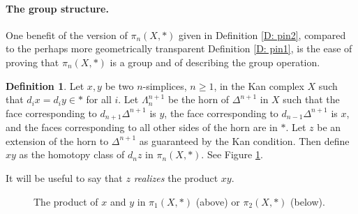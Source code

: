 \documentclass[12pt]{article}
\theoremstyle{plain}
\theoremstyle{definition}
\newtheorem{definition}[theorem]{Definition}
\theoremstyle{remark}
\begin{document}
\paragraph{The group structure.}

One benefit of the version of $\pi_n(X,*)$ given in Definition \ref{D: pin2}, compared to the perhaps more geometrically transparent Definition \ref{D: pin1}, is the ease of  proving that $\pi_n(X,*)$ is a group and of describing the group operation.

\begin{definition}\label{D: pi product}
Let $x,y$ be two $n$-simplices, $n\geq 1$, in the Kan complex $X$ such that $d_ix=d_iy\in *$ for all $i$. Let $\Lambda^{n+1}_n$ be the horn of $\Delta^{n+1}$ in $X$ such that the face corresponding to $d_{n+1}\Delta^{n+1}$ is $y$, the face corresponding to $d_{n-1}\Delta^{n+1}$ is $x$, and the faces corresponding to all other sides of the horn are in $*$. Let $z$ be an extension of the horn to $\Delta^{n+1}$ as guaranteed by the Kan condition. Then define $xy$ as the homotopy class of $d_nz$ in $\pi_n(X,*)$. See Figure \ref{F: fig26}.

It will be useful to say that $z$ \emph{realizes} the product $xy$. 
\end{definition}



\begin{figure}[!htp]
\begin{center}
\end{center}
\caption{The product of $x$ and $y$ in $\pi_1(X,*)$ (above) or $\pi_2(X,*)$ (below).}\label{F: fig26}
\end{figure}
\end{document}
